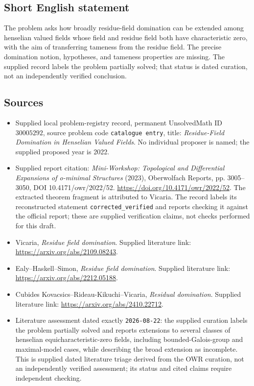 \documentclass[11pt]{article}
\begin{document}
\subsection{Short English statement}
The problem asks how broadly residue-field domination can be extended among henselian valued fields whose field and residue field both have characteristic zero, with the aim of transferring tameness from the residue field. The precise domination notion, hypotheses, and tameness properties are missing. The supplied record labels the problem partially solved; that status is dated curation, not an independently verified conclusion.
\subsection{Sources}
\begin{itemize}
\item Supplied local problem-registry record, permanent UnsolvedMath ID \(30005292\), source problem code \texttt{catalogue entry}, title: \emph{Residue-Field Domination in Henselian Valued Fields}. No individual proposer is named; the supplied proposed year is 2022.
\item Supplied report citation: \emph{Mini-Workshop: Topological and Differential Expansions of o-minimal Structures} (2023), Oberwolfach Reports, pp. 3005--3050, DOI 10.4171/owr/2022/52. \url{https://doi.org/10.4171/owr/2022/52}. The extracted theorem fragment is attributed to Vicaria. The record labels its reconstructed statement \texttt{corrected\_verified} and reports checking it against the official report; these are supplied verification claims, not checks performed for this draft.
\item Vicaria, \emph{Residue field domination}. Supplied literature link: \url{https://arxiv.org/abs/2109.08243}.
\item Ealy--Haskell--Simon, \emph{Residue field domination}. Supplied literature link: \url{https://arxiv.org/abs/2212.05188}.
\item Cubides Kovacsics--Rideau-Kikuchi--Vicaria, \emph{Residual domination}. Supplied literature link: \url{https://arxiv.org/abs/2410.22712}.
\item Literature assessment dated exactly \texttt{2026-08-22}: the supplied curation labels the problem partially solved and reports extensions to several classes of henselian equicharacteristic-zero fields, including bounded-Galois-group and maximal-model cases, while describing the broad extension as incomplete. This is supplied dated literature triage derived from the OWR curation, not an independently verified assessment; its status and cited claims require independent checking.
\end{itemize}
\end{document}
